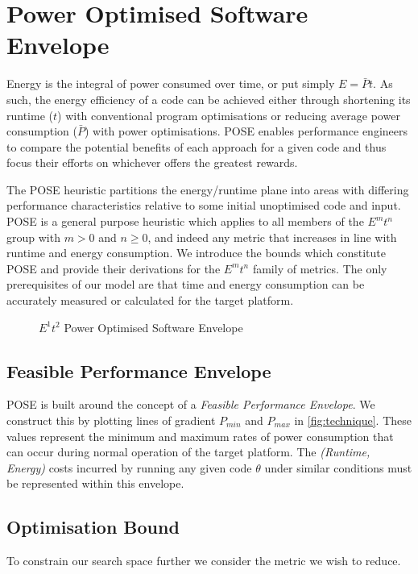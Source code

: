 \section{Power Optimised Software Envelope}
\label{sec:pose}
\noindent
Energy is the integral of power consumed over time, or put simply $E = \bar{P}t$.
As such, the energy efficiency of a code can be achieved either through shortening its runtime ($t$) with conventional program optimisations or reducing average power consumption ($\bar{P}$) with power optimisations.
POSE enables performance engineers to compare the potential benefits of each approach for a given code and thus focus their efforts on whichever offers the greatest rewards.

The POSE heuristic partitions the energy/runtime plane into areas with differing performance characteristics relative to some initial unoptimised code and input.
POSE is a general purpose heuristic which applies to all members of the $E^mt^n$ group with $m > 0$ and $n \geq 0$, and indeed any metric that increases in line with runtime and energy consumption.
We introduce the bounds which constitute POSE and provide their derivations for the $E^mt^n$ family of metrics.
The only prerequisites of our model are that time and energy consumption can be accurately measured or calculated for the target platform.

\begin{figure}
\scriptsize
\centering

\caption{$E^1t^2$ Power Optimised Software Envelope}
\label{fig:technique}
\end{figure}

\subsection{Feasible Performance Envelope}
\noindent
POSE is built around the concept of a \emph{Feasible Performance Envelope}.
We construct this by plotting lines of gradient $P_{min}$ and $P_{max}$ in \autoref{fig:technique}.
These values represent the minimum and maximum rates of power consumption that can occur during normal operation of the target platform.
The \textit{(Runtime, Energy)} costs incurred by running any given code $\theta$ under similar conditions must be represented within this envelope.

\subsection{Optimisation Bound}
\noindent
To constrain our search space further we consider the metric we wish to reduce.

